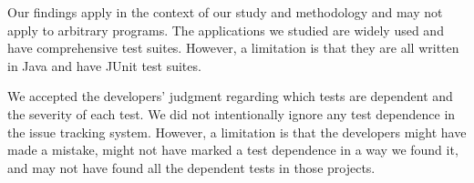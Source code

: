 Our findings apply in the context of our study and methodology and may not
apply to arbitrary programs.
The applications we studied are widely used and have comprehensive test suites.
However, a limitation is that they are all written in 
Java and have JUnit test suites.  

We accepted the developers' judgment regarding which tests are dependent
and the severity of each test.  We did not intentionally ignore
any test dependence in the issue tracking system.
However, a limitation is that the developers might have made a mistake,
might not have marked a test dependence in a way we found it, and may not
have found all the dependent tests in those projects. 



